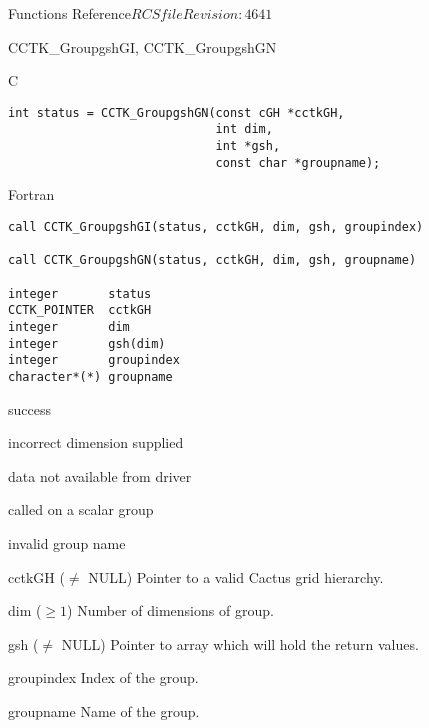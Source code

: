 \begin{cactuspart}{ Functions Reference}{$RCSfile$}{$Revision: 4641 $}
\begin{FunctionDescription}{CCTK\_GroupgshGI, CCTK\_GroupgshGN}
\begin{SynopsisSection}
\begin{Synopsis}{C}
\begin{verbatim}
int status = CCTK_GroupgshGN(const cGH *cctkGH,
                             int dim,
                             int *gsh,
                             const char *groupname);
\end{verbatim}
\end{Synopsis}
\begin{Synopsis}{Fortran}
\begin{verbatim}
call CCTK_GroupgshGI(status, cctkGH, dim, gsh, groupindex)

call CCTK_GroupgshGN(status, cctkGH, dim, gsh, groupname)

integer       status
CCTK_POINTER  cctkGH
integer       dim
integer       gsh(dim)
integer       groupindex
character*(*) groupname
\end{verbatim}
\end{Synopsis}
\end{SynopsisSection}

\begin{ResultSection}
\begin{Result}{0} success \end{Result}
\begin{Result}{-1} incorrect dimension supplied \end{Result}
\begin{Result}{-2} data not available from driver \end{Result}
\begin{Result}{-3} called on a scalar group \end{Result}
\begin{Result}{-4} invalid group name \end{Result}
\end{ResultSection}

\begin{ParameterSection}
\begin{Parameter}{cctkGH ($\ne$ NULL)} Pointer to a valid Cactus grid hierarchy. \end{Parameter}
\begin{Parameter}{dim ($\ge 1$)} Number of dimensions of group. \end{Parameter}
\begin{Parameter}{gsh ($\ne$ NULL)} Pointer to array which will hold the return values. \end{Parameter}
\begin{Parameter}{groupindex} Index of the group. \end{Parameter}
\begin{Parameter}{groupname} Name of the group. \end{Parameter}
\end{ParameterSection}


\end{FunctionDescription}
\end{cactuspart}
